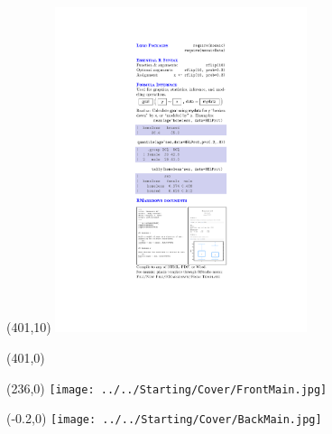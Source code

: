 \documentclass{article}
\begin{document}
\begin{textblock}{3}(401,10) %
\noindent\includegraphics[width=2.9in]{frontflap.pdf}
\end{textblock}


\begin{textblock}{3}(401,0) %
\noindent{}
\end{textblock}


\begin{textblock}{6.125}(236,0)
\noindent\texttt{[image: ../../Starting/Cover/FrontMain.jpg]}
\end{textblock}

\begin{textblock}{6.125}(-0.2,0)
\noindent\texttt{[image: ../../Starting/Cover/BackMain.jpg]}
\end{textblock}
\end{document}

